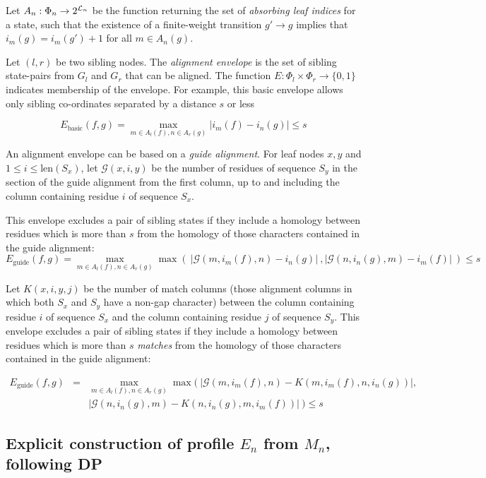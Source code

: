 \documentclass{article}
\newcommand{\seclabel}[1]{\label{sec.#1}}
\newcommand\States{\Phi}
\newcommand\seqlen[1]{\mbox{len}(#1)}
\begin{document}
Let $A_n:\States_n \to 2^{{\cal L}_n}$ be the function returning the set of {\em absorbing leaf indices} for a state, such that the existence of a finite-weight transition $g' \to g$ implies that $i_m(g) = i_m(g') + 1$ for all $m \in A_n(g)$.

Let $(l,r)$ be two sibling nodes.
The {\em alignment envelope} is the set of sibling state-pairs from $G_l$ and $G_r$ that can be aligned.
The function $E\colon \States_l \times \States_r \to \{ 0,1 \}$ indicates membership of the envelope.
For example, this basic envelope allows only sibling co-ordinates separated by a distance $s$ or less

\[
E_{\mbox{basic}}(f,g) = \max_{m \in A_l(f), n \in A_r(g)} |i_m(f)-i_n(g)| \leq s
\]

An alignment envelope can be based on a {\em guide alignment}. 
For leaf nodes $x,y$ and $1 \leq i \leq \seqlen{S_x}$, let $\mathcal{G}(x,i,y)$ be the number of residues of sequence $S_y$
in the section of the guide alignment from the first column, up to and including the column containing residue $i$ of sequence $S_x$.

This envelope excludes a pair of sibling states if they include a homology between residues which is more than $s$ from the homology of those characters contained in the guide alignment:
\[
E_{\mbox{guide}}(f,g) = \max_{m \in A_l(f), n \in A_r(g)} \max(\ |\mathcal{G}(m,i_m(f),n)-i_n(g)| \ ,  |\mathcal{G}(n,i_n(g),m)-i_m(f)|\ ) \leq s
\]


Let $K(x,i,y,j)$ be the number of match columns (those alignment columns in which both $S_x$ and $S_y$ have a non-gap character) between the column containing residue $i$ of sequence $S_x$ and the column containing residue $j$ of sequence $S_y$.  
This envelope excludes a pair of sibling states if they include a homology between residues which is more than $s$ {\em matches} from the homology of those characters contained in the guide alignment:

\begin{align*}
E_{\mbox{guide}}(f,g) & = & \max_{m \in A_l(f), n \in A_r(g)} \max(\ |\mathcal{G}(m,i_m(f),n)-K(m,i_m(f),n,i_n(g))|, \ \\
& &|\mathcal{G}(n,i_n(g),m)-K(n,i_n(g),m,i_m(f))|\ ) \leq s
\end{align*}








\subsection{Explicit construction of profile $E_n$ from $M_n$, following DP}
\seclabel{Mn2En}
\end{document}
